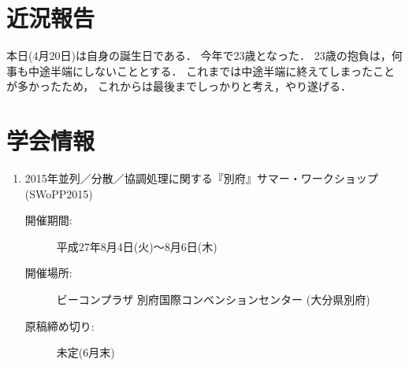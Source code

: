\documentclass[fleqn, 12pt]{extarticlej}
\begin{document}
\section{近況報告}
本日(4月20日)は自身の誕生日である．
今年で23歳となった．
23歳の抱負は，何事も中途半端にしないこととする．
これまでは中途半端に終えてしまったことが多かったため，
これからは最後までしっかりと考え，やり遂げる．
\section{学会情報}
\begin{enumerate}
    \item 2015年並列／分散／協調処理に関する『別府』サマー・ワークショップ (SWoPP2015)
        \begin{description}
            \item[開催期間:]平成27年8月4日(火)〜8月6日(木)
            \item[開催場所:] ビーコンプラザ 別府国際コンベンションセンター (大分県別府) 
            \item[原稿締め切り:]未定(6月末)
        \end{description}

\end{enumerate}
\end{document}
